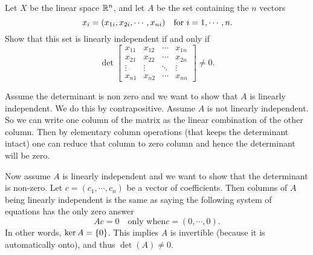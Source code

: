 \begin{problem}
	Let $ X $ be the linear space $ \mathbb{R}^n $, and let $ A $ be the set containing the $ n $ vectors
	\[ x_i = (x_{1i},x_{2i},\cdots,x_{ni}) \quad \text{for $ i=1,\cdots, n $}. \]
	Show that this set is linearly independent if and only if
	\[ \det\begin{bmatrix}
		x_{11} & x_{12} &  \cdots & x_{1n} \\
		x_{21} & x_{22} & \cdots & x_{2n} \\
		\vdots & \vdots & \ddots & \vdots \\
		x_{n1} & x_{n2} & \cdots & x_{nn}
	\end{bmatrix} \neq 0.\]
\end{problem}
\begin{solution}
	Assume the determinant is non zero and we want to show that $ A $ is linearly independent. We do this by contrapositive. Assume $ A $ is not linearly independent. So we can write one column of the matrix as the linear combination of the other column. Then by elementary column operations (that keeps the determinant intact) one can reduce that column to zero column and hence the determinant will be zero.
	
	Now assume $ A $ is linearly independent and we want to show that the determinant is non-zero. Let $ c=(c_1,\cdots,c_n) $ be a vector of coefficients. Then columns of $ A $ being linearly independent is the same as saying the following system of equations has the only zero answer
	\[ Ac = 0 \quad \text{only when} c=(0,\cdots,0). \]
	In other words, $ \ker A = \{0\} $. This implies $ A $ is invertible (because it is automatically onto), and thus $ \det(A) \neq 0. $
\end{solution}










